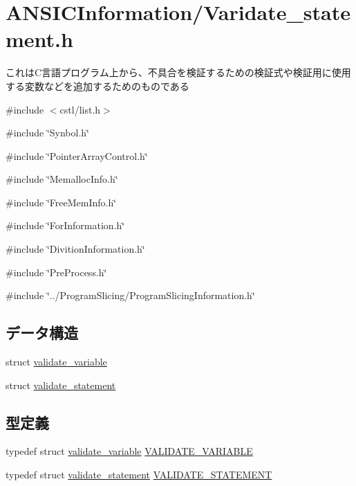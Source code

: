 \section{ANSICInformation/Varidate\_\-statement.h}
\label{Varidate__statement_8h}


これはC言語プログラム上から、不具合を検証するための検証式や検証用に使用する変数などを追加するためのものである  


{\ttfamily \#include $<$cstl/list.h$>$}\par
{\ttfamily \#include \char`\"{}Synbol.h\char`\"{}}\par
{\ttfamily \#include \char`\"{}PointerArrayControl.h\char`\"{}}\par
{\ttfamily \#include \char`\"{}MemallocInfo.h\char`\"{}}\par
{\ttfamily \#include \char`\"{}FreeMemInfo.h\char`\"{}}\par
{\ttfamily \#include \char`\"{}ForInformation.h\char`\"{}}\par
{\ttfamily \#include \char`\"{}DivitionInformation.h\char`\"{}}\par
{\ttfamily \#include \char`\"{}PreProcess.h\char`\"{}}\par
{\ttfamily \#include \char`\"{}../ProgramSlicing/ProgramSlicingInformation.h\char`\"{}}\par
\subsection*{データ構造}
\begin{DoxyCompactItemize}
\item 
struct \hyperlink{structvalidate__variable}{validate\_\-variable}
\item 
struct \hyperlink{structvalidate__statement}{validate\_\-statement}
\end{DoxyCompactItemize}
\subsection*{型定義}
\begin{DoxyCompactItemize}
\item 
typedef struct \hyperlink{structvalidate__variable}{validate\_\-variable} \hyperlink{Varidate__statement_8h_a44deffa9c818ee2269d1af086048deee}{VALIDATE\_\-VARIABLE}
\item 
typedef struct \hyperlink{structvalidate__statement}{validate\_\-statement} \hyperlink{Varidate__statement_8h_aa29cf26f061e9a911576b7bd9ca1c8eb}{VALIDATE\_\-STATEMENT}
\end{DoxyCompactItemize}
